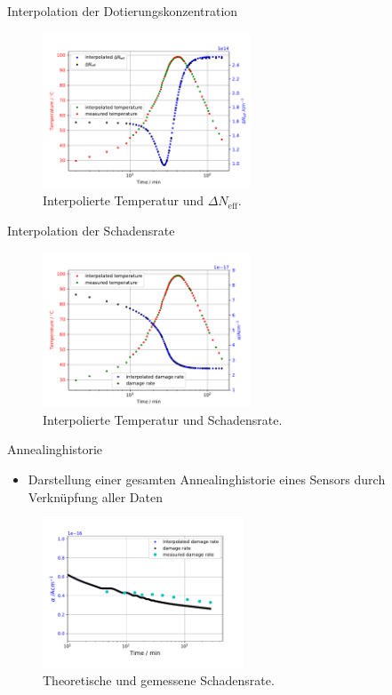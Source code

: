 \documentclass[aspectratio=1610, 9pt]{beamer}
\begin{document}
\begin{frame}{Interpolation der Dotierungskonzentration}
  \begin{figure}
      \includegraphics[width=0.55\textwidth]{images/interpolationtdata.PDF}
  \caption{Interpolierte Temperatur und $\Delta N_{\mathrm{eff}}$.}
  \end{figure}
\end{frame}


\begin{frame}{Interpolation der Schadensrate}
  \begin{figure}
      \includegraphics[width=0.55\textwidth]{images/damageinterpolation.PDF}
  \caption{Interpolierte Temperatur und Schadensrate.}
  \end{figure}
\end{frame}

\begin{frame}{Annealinghistorie}
  \begin{itemize}
    \item Darstellung einer gesamten Annealinghistorie eines Sensors durch Verknüpfung aller Daten
  \end{itemize}

  \begin{figure}
      \includegraphics[width=0.53\textwidth]{images/damage_ohne_temperatur.PDF}
  \caption{Theoretische und gemessene Schadensrate.}
  \end{figure}
\end{frame}
\end{document}
